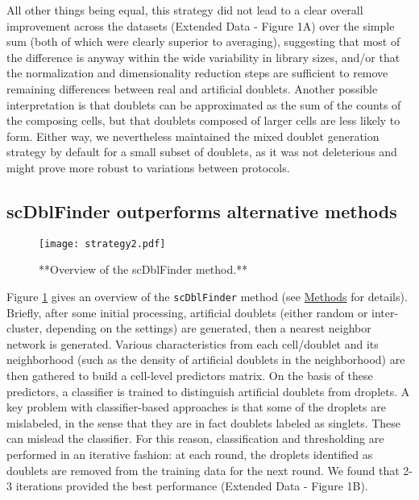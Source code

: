 \documentclass[10pt,a4paper,twocolumn]{article}
\begin{document}
All other things being equal, this strategy did not lead to a clear overall improvement across the datasets (Extended Data - Figure 1A) over the simple sum (both of which were clearly superior to averaging), suggesting that most of the difference is anyway within the wide variability in library sizes, and/or that the normalization and dimensionality reduction steps are sufficient to remove remaining differences between real and artificial doublets. Another possible interpretation is that doublets can be approximated as the sum of the counts of the composing cells, but that doublets composed of larger cells are less likely to form. Either way, we nevertheless maintained the mixed doublet generation strategy by default for a small subset of doublets, as it was not deleterious and might prove more robust to variations between protocols.



\subsection{scDblFinder outperforms alternative methods}

\begin{figure}
{\centering \texttt{[image: strategy2.pdf]} }
\caption{**Overview of the scDblFinder method.**}\label{fig:strategy}
\end{figure}

Figure \ref{fig:strategy} gives an overview of the \texttt{scDblFinder} method (see \protect\hyperlink{methods}{Methods} for details).
Briefly, after some initial processing, artificial doublets (either random or inter-cluster, depending on the settings) are generated, then a nearest neighbor network is generated.
Various characteristics from each cell/doublet and its neighborhood (such as the density of artificial doublets in the neighborhood) are then gathered to build a cell-level predictors matrix.
On the basis of these predictors, a classifier is trained to distinguish artificial doublets from droplets.
A key problem with classifier-based approaches is that some of the droplets are mislabeled, in the sense that they are in fact doublets labeled as singlets.
These can mislead the classifier. For this reason, classification and thresholding are performed in an iterative fashion:
at each round, the droplets identified as doublets are removed from the training data for the next round.
We found that 2-3 iterations provided the best performance (Extended Data - Figure 1B).
\end{document}

